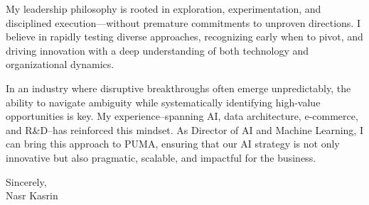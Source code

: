 \vspace{2ex}


My leadership philosophy is rooted in exploration, experimentation, and disciplined execution—without premature commitments to unproven directions. I believe in rapidly testing diverse approaches, recognizing early when to pivot, and driving innovation with a deep understanding of both technology and organizational dynamics.


\vspace{1ex}


In an industry where disruptive breakthroughs often emerge unpredictably, the ability to navigate ambiguity while systematically identifying high-value opportunities is key. My experience--spanning AI, data architecture, e-commerce, and R\&D--has reinforced this mindset. As Director of AI and Machine Learning, I can bring this approach to PUMA, ensuring that our AI strategy is not only innovative but also pragmatic, scalable, and impactful for the business.







\vspace{5ex}

Sincerely,\\
	
Nasr Kasrin


